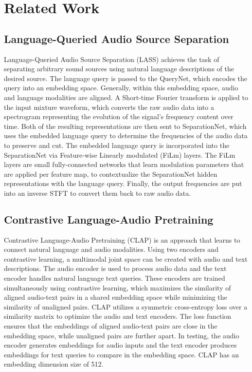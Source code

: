 \documentclass[11pt]{article}
\begin{document}
\section{Related Work}

\subsection{Language-Queried Audio Source Separation}
Language-Queried Audio Source Separation (LASS) achieves the task of separating arbitrary sound sources using natural language descriptions of the desired source. The language query is passed to the QueryNet, which encodes the query into an embedding space. Generally, within this embedding space, audio and language modalities are aligned. A Short-time Fourier transform is applied to the input mixture waveform, which converts the raw audio data into a spectrogram representing the evolution of the signal’s frequency content over time. Both of the resulting representations are then sent to SeparationNet, which uses the embedded language query to determine the frequencies of the audio data to preserve and cut. The embedded language query is incorporated into the SeparationNet via Feature-wise Linearly modulated (FiLm) layers. The FiLm layers are small fully-connected networks that learn modulation parameters that are applied per feature map, to contextualize the SeparationNet hidden representations with the language query. Finally, the output frequencies are put into an inverse STFT to convert them back to raw audio data. 

\subsection{Contrastive Language-Audio Pretraining}
Contrastive Language-Audio Pretraining (CLAP) is an approach that learns to connect natural language and audio modalities. Using two encoders and contrastive learning, a multimodal joint space can be created with audio and text descriptions. The audio encoder is used to process audio data and the text encoder handles natural language text queries. These encoders are trained simultaneously using contrastive learning, which maximizes the similarity of aligned audio-text pairs in a shared embedding space while minimizing the similarity of unaligned pairs. CLAP utilizes a symmetric cross-entropy loss over a similarity matrix to optimize the audio and text encoders. The loss function ensures that the embeddings of aligned audio-text pairs are close in the embedding space, while unaligned pairs are further apart. In testing, the audio encoder generates embeddings for audio inputs and the text encoder produces embeddings for text queries to compare in the embedding space. CLAP has an embedding dimension size of 512.
\end{document}
